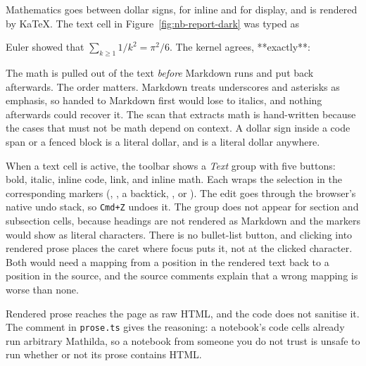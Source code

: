 Mathematics goes between dollar signs, \mcode{\$\ldots\$} for inline and
\mcode{\$\$\ldots\$\$} for display, and is rendered by KaTeX. The text cell in
Figure~\ref{fig:nb-report-dark} was typed as

\begin{shell}
Euler showed that $\sum_{k\ge 1} 1/k^2 = \pi^2/6$. The kernel agrees, **exactly**:
\end{shell}

The math is pulled out of the text \emph{before} Markdown runs and put back
afterwards. The order matters. Markdown treats underscores and asterisks as
emphasis, so  handed to Markdown first would lose
 to italics, and nothing afterwards could recover it. The
scan that extracts math is hand-written because the cases that must not be
math depend on context. A dollar sign inside a code span or a fenced block is
a literal dollar, and \mcode{\textbackslash\$} is a literal dollar anywhere.%

When a text cell is active, the toolbar shows a \emph{Text} group with five
buttons: bold, italic, inline code, link, and inline math. Each wraps the
selection in the corresponding markers (\mcode{**}, \mcode{*}, a backtick,
, or \mcode{\$}). The edit goes through the browser's
native undo stack, so \texttt{Cmd+Z} undoes it. The group does not appear for
section and subsection cells, because headings are not rendered as Markdown
and the markers would show as literal characters. There is no bullet-list
button, and clicking into rendered prose places the caret where focus puts
it, not at the clicked character. Both would need a mapping from a position
in the rendered text back to a position in the source, and the source
comments explain that a wrong mapping is worse than none.

Rendered prose reaches the page as raw HTML, and the code does not sanitise
it. The comment in \texttt{prose.ts} gives the reasoning: a notebook's code
cells already run arbitrary Mathilda, so a notebook from someone you do not
trust is unsafe to run whether or not its prose contains HTML.

